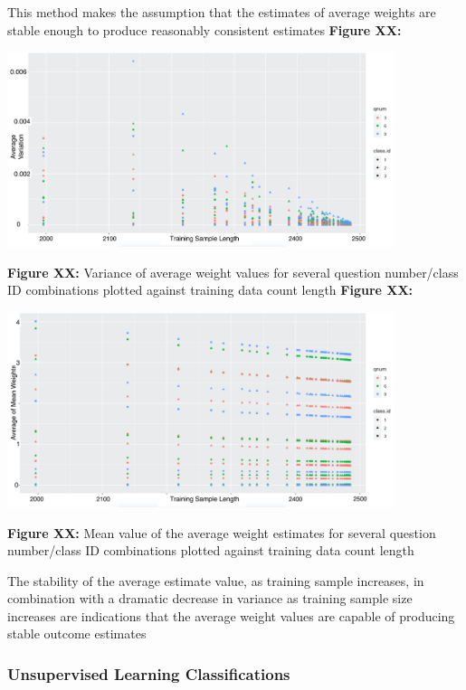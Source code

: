 \documentclass[12pt,]{article}
\begin{document}
This method makes the assumption that the estimates of average weights
are stable enough to produce reasonably consistent estimates
\textbf{Figure XX:}

\begin{center}
\includegraphics[width=0.85\textwidth]{VariancePlot.jpg}
\end{center}

\textbf{Figure XX:} Variance of average weight values for several
question number/class ID combinations plotted against training data
count length \textbf{Figure XX:}

\begin{center}
\includegraphics[width=0.85\textwidth]{MeanPlot.jpg}
\end{center}

\textbf{Figure XX:} Mean value of the average weight estimates for
several question number/class ID combinations plotted against training
data count length

The stability of the average estimate value, as training sample
increases, in combination with a dramatic decrease in variance as
training sample size increases are indications that the average weight
values are capable of producing stable outcome estimates

\hypertarget{unsupervised-learning-classifications}{%
\subsubsection{Unsupervised Learning
Classifications}\label{unsupervised-learning-classifications}}
\end{document}
